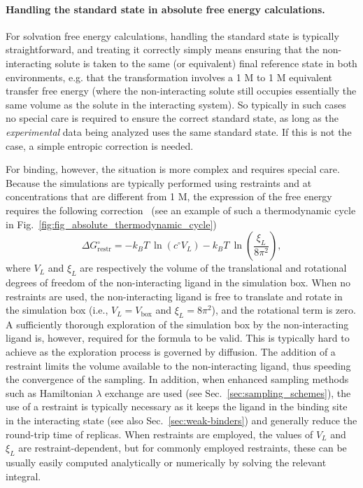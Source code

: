\documentclass[9pt,bestpractices]{livecoms}
\begin{document}
\paragraph{Handling the standard state in absolute free energy calculations.}
For solvation free energy calculations, handling the standard state is typically straightforward, and treating it correctly simply means ensuring that the non-interacting solute is taken to the same (or equivalent) final reference state in both environments, e.g. that the transformation involves a 1 M to 1 M equivalent transfer free energy (where the non-interacting solute still occupies essentially the same volume as the solute in the interacting system).
So typically in such cases no special care is required to ensure the correct standard state, as long as the \emph{experimental} data being analyzed uses the same standard state.
If this is not the case, a simple entropic correction is needed.

For binding, however, the situation is more complex and requires special care.
Because the simulations are typically performed using restraints and at concentrations that are different from 1 M, the expression of the free energy requires the following correction~\cite{gilson1997statisticalthermodynamic} (see an example of such a thermodynamic cycle in Fig.~\ref{fig:fig_absolute_thermodynamic_cycle})
\begin{equation}\label{eq:restraint-correction}
    \Delta G^{\circ}_{\mathrm{restr}} = -k_BT ~ \ln \left( c^{\circ}{V_L} \right) -k_BT ~ \ln \left( \frac{\xi_L}{8 \pi^2} \right),
\end{equation}
where $V_L$ and $\xi_L$ are respectively the volume of the translational and rotational degrees of freedom of the non-interacting ligand in the simulation box.
When no restraints are used, the non-interacting ligand is free to translate and rotate in the simulation box (i.e., $V_L = V_{\mathrm{box}}$ and $\xi_L = 8\pi^2$), and the rotational term is zero.
A sufficiently thorough exploration of the simulation box by the non-interacting ligand is, however, required for the formula to be valid.
This is typically hard to achieve as the exploration process is governed by diffusion.
The addition of a restraint limits the volume available to the non-interacting ligand, thus speeding the convergence of the sampling.
In addition, when enhanced sampling methods such as Hamiltonian $\lambda$ exchange are used (see Sec.~\ref{sec:sampling_schemes}), the use of a restraint is typically necessary as it keeps the ligand in the binding site in the interacting state (see also Sec.~\ref{sec:weak-binders}) and generally reduce the round-trip time of replicas.
When restraints are employed, the values of $V_L$ and $\xi_L$ are restraint-dependent, but for commonly employed restraints, these can be usually easily computed analytically or numerically by solving the relevant integral.
\end{document}
